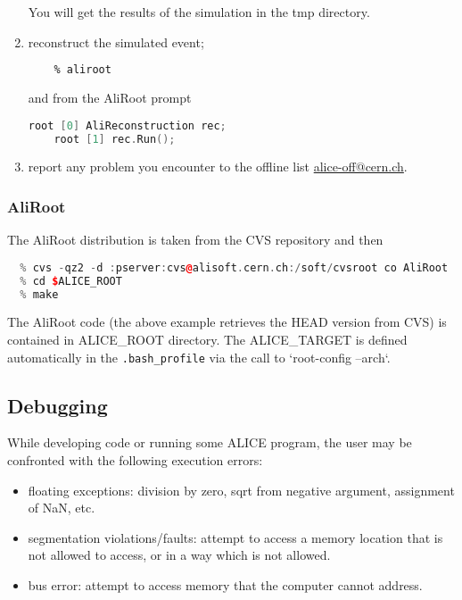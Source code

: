 \documentclass[12pt,a4paper,twoside]{article}
\begin{document}
\begin{enumerate}
  You will get the results of the simulation in the tmp directory.

\item reconstruct the simulated event;
  \begin{lstlisting}[language=sh]
    % cd tmp
    % aliroot
  \end{lstlisting}

  and from the AliRoot prompt
  \begin{lstlisting}[language=C++]
    root [0] AliReconstruction rec;
    root [1] rec.Run();
  \end{lstlisting}

\item report any problem you encounter to the offline list \url{alice-off@cern.ch}.

\end{enumerate}


\subsubsection{AliRoot}

The AliRoot distribution is taken from the CVS repository and then 
\begin{lstlisting}[language=C++]
  % cd $ALICE
  % cvs -qz2 -d :pserver:cvs@alisoft.cern.ch:/soft/cvsroot co AliRoot
  % cd $ALICE_ROOT
  % make
\end{lstlisting}

The AliRoot code (the above example retrieves the HEAD version from CVS) is contained in
ALICE\_ROOT directory. The ALICE\_TARGET is defined automatically in
the \texttt{.bash\_profile} via the call to `root-config --arch`.



\subsection{Debugging}

While developing code or running some ALICE program, the user may be
confronted with the following execution errors:

\begin{itemize}
\item floating exceptions: division by zero, sqrt from negative
  argument, assignment of NaN, etc.
\item segmentation violations/faults: attempt to access a memory
  location that is not allowed to access, or in a way which is not
  allowed.
\item bus error: attempt to access memory that the computer cannot
  address.
\end{itemize}
\end{document}
